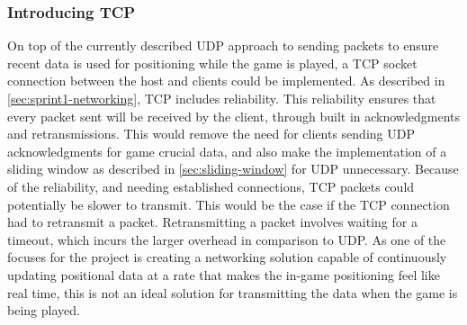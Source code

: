 \subsubsection{Introducing TCP}
On top of the currently described UDP approach to sending packets to ensure recent data is used for positioning while the game is played, a TCP socket connection between the host and clients could be implemented.
As described in \autoref{sec:sprint1-networking}, TCP includes reliability.
This reliability ensures that every packet sent will be received by the client, through built in acknowledgments and retransmissions.
This would remove the need for clients sending UDP acknowledgments for game crucial data, and also make the implementation of a sliding window as described in \autoref{sec:sliding-window} for UDP unnecessary.
Because of the reliability, and needing established connections, TCP packets could potentially be slower to transmit.
This would be the case if the TCP connection had to retransmit a packet.
Retransmitting a packet involves waiting for a timeout, which incurs the larger overhead in comparison to UDP. 
As one of the focuses for the project is creating a networking solution capable of continuously updating positional data at a rate that makes the in-game positioning feel like real time, this is not an ideal solution for transmitting the data when the game is being played.
